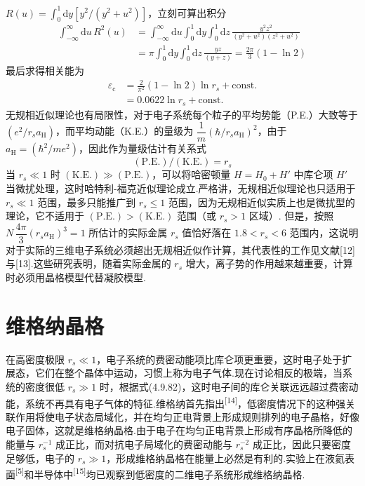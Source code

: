 $R(u)=\displaystyle\int_{0}^{1}\mathrm{d}y\left[y^{2}/\left(y^{2}+u^{2}\right)\right]$，立刻可算出积分
\begin{equation}
\begin{aligned}
  \int_{-\infty}^{\infty}\mathrm{d}u\,R^{2}(u)
  &=\int_{-\infty}^{\infty}\mathrm{d}u\int_{0}^{1}\mathrm{d}y
  \int_{0}^{1}\mathrm{d}z\,
  \frac{y^{2}z^{2}}{\left(y^{2}+u^{2}\right)\left(z^{2}+u^{2}\right)}\\
  &=\pi\int_{0}^{1}\mathrm{d}y\int_{0}^{1}\mathrm{d}z\,
  \frac{yz}{\left(y+z\right)}
  =\frac{2\pi}{3}\left(1-\ln 2\right)
\end{aligned}
\end{equation}
最后求得相关能为
\begin{equation*}
\begin{aligned}
  \varepsilon_{\mathrm{c}}
  &=\frac{2}{\pi^{2}}\left(1-\ln 2\right)\ln r_{s}+\mathrm{const.}\\
  &=0.0622\ln r_{s}+\mathrm{const.}
\end{aligned}
\end{equation*}
无规相近似理论也有局限性，对于电子系统每个粒子的平均势能（P.E.）大致等于 $\left(e^{2}/r_{s}a_{\mathrm{H}}\right)$，而平均动能（K.E.）的量级为
$\dfrac{1}{m}\left(\hbar/r_{s}a_{\mathrm{H}}\right)^{2}$，由于 $a_{\mathrm{H}}=\left(\hbar^{2}/me^{2}\right)$，因此作为量级估计有关系式
\begin{equation}
  \left(\mathrm{P.E.}\right)/\left(\mathrm{K.E.}\right)=r_{s}
\end{equation}
当 $r_{s}\ll 1$ 时 $\left(\mathrm{K.E.}\right)\gg\left(\mathrm{P.E.}\right)$，可以将哈密顿量 $H=H_{0}+H'$ 中库仑项 $H'$ 当微扰处理，这时哈特利-福克近似理论成立.严格讲，无规相近似理论也只适用于 $r_{s}\ll 1$ 范围，最多只能推广到 $r_{s}\leqslant 1$ 范围，因为无规相近似实质上也是微扰型的理论，它不适用于 $\left(\mathrm{P.E.}\right)>\left(\mathrm{K.E.}\right)$ 范围（或 $r_{s}>1$ 区域）. 但是，按照 $N\,\dfrac{4\pi}{3}\left(r_{s}a_{\mathrm{H}}\right)^{3}=1$ 所估计的实际金属 $r_{s}$ 值恰好落在 $1.8<r_{s}<6$ 范围内，这说明对于实际的三维电子系统必须超出无规相近似作计算，其代表性的工作见文献[12]与[13].这些研究表明，随着实际金属的 $r_{s}$ 增大，离子势的作用越来越重要，计算时必须用晶格模型代替凝胶模型.

\section{维格纳晶格}

在高密度极限 $r_{s}\ll 1$，电子系统的费密动能项比库仑项更重要，这时电子处于扩展态，它们在整个晶体中运动，习惯上称为电子气体.现在讨论相反的极端，当系统的密度很低 $r_{s}\gg 1$ 时，根据式(4.9.82)，这时电子间的库仑关联远远超过费密动能，系统不再具有电子气体的特征.维格纳首先指出\textsuperscript{[14]}，低密度情况下的这种强关联作用将使电子状态局域化，并在均匀正电背景上形成规则排列的电子晶格，好像电子固体，这就是维格纳晶格.由于电子在均匀正电背景上形成有序晶格所降低的能量与 $r_{s}^{-1}$ 成正比，而对抗电子局域化的费密动能与 $r_{s}^{-2}$ 成正比，因此只要密度足够低，电子的 $r_{s}\gg 1$，形成维格纳晶格在能量上必然是有利的.实验上在液氦表面\textsuperscript{[5]}和半导体中\textsuperscript{[15]}均已观察到低密度的二维电子系统形成维格纳晶格.

